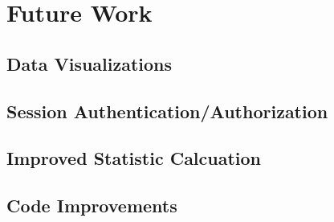 \chapter{Future Work}

\section{Data Visualizations}

\section{Session Authentication/Authorization}

\section{Improved Statistic Calcuation}


\section{Code Improvements}






